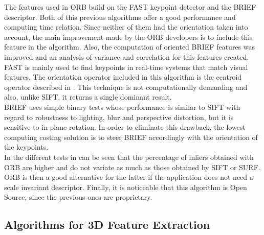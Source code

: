 The features used in ORB build on the FAST\cite{fast} keypoint detector and the BRIEF\cite{brief} descriptor. Both of this previous algorithms offer a good performance and computing time relation. Since neither of them had the orientation taken into account, the main improvement made by the ORB developers is to include this feature in the algorithm. Also, the computation of oriented BRIEF features was improved and an analysis of variance and correlation for this features created. 
\\

FAST is mainly used to find keypoints in real-time systems that match visual features. The orientation operator included in this algorithm is the centroid operator described in \cite{orientation_corners}. This technique is not computationally demanding and also, unlike SIFT, it returns a single dominant result. 
\\

BRIEF uses simple binary tests whose performance is similar to SIFT with regard to robustness to lighting, blur and perspective distortion, but it is sensitive to in-plane rotation. In order to eliminate this drawback, the lowest computing costing solution is to steer BRIEF accordingly with the orientation of the keypoints. 
\\

In the different tests in \cite{orb} can be seen that the percentage of inliers obtained with ORB are higher and do not variate as much as those obtained by SIFT or SURF. 
ORB is then a good alternative for the latter if the application does not need a scale invariant descriptor. 
Finally, it is noticeable that this algorithm is Open Source, since the previous ones are proprietary. 


\subsection{Algorithms for 3D Feature Extraction}
\label{3d_features}


